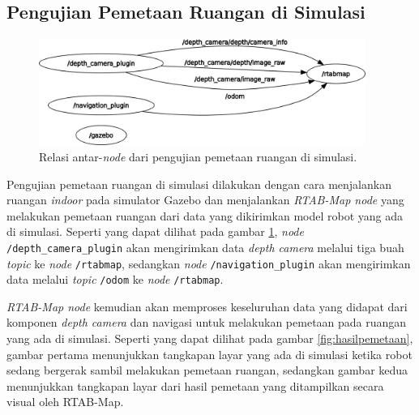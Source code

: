 \subsection{Pengujian Pemetaan Ruangan di Simulasi}
\label{subsec:slamsimulasi}

\begin{figure}[ht]
  \centering
  \includegraphics[width=0.95\textwidth,keepaspectratio]{gambar/rosgraph-slam-simulation.png}
  \caption{Relasi antar-\emph{node} dari pengujian pemetaan ruangan di simulasi.}
  \label{fig:rosgraphslamsimulation}
\end{figure}

Pengujian pemetaan ruangan di simulasi dilakukan dengan cara menjalankan ruangan \emph{indoor} pada simulator Gazebo dan menjalankan \emph{RTAB-Map node} yang melakukan pemetaan ruangan dari data yang dikirimkan model robot yang ada di simulasi.
Seperti yang dapat dilihat pada gambar \ref{fig:rosgraphslamsimulation},
  \emph{node} \lstinline{/depth_camera_plugin} akan mengirimkan data \emph{depth camera} melalui tiga buah \emph{topic} ke \emph{node} \lstinline{/rtabmap},
  sedangkan \emph{node} \lstinline{/navigation_plugin} akan mengirimkan data melalui \emph{topic} \lstinline{/odom} ke \emph{node} \lstinline{/rtabmap}.

\emph{RTAB-Map node} kemudian akan memproses keseluruhan data yang didapat dari komponen \emph{depth camera} dan navigasi untuk melakukan pemetaan pada ruangan yang ada di simulasi.
Seperti yang dapat dilihat pada gambar \ref{fig:hasilpemetaan},
  gambar pertama menunjukkan tangkapan layar yang ada di simulasi ketika robot sedang bergerak sambil melakukan pemetaan ruangan,
  sedangkan gambar kedua menunjukkan tangkapan layar dari hasil pemetaan yang ditampilkan secara visual oleh RTAB-Map.


